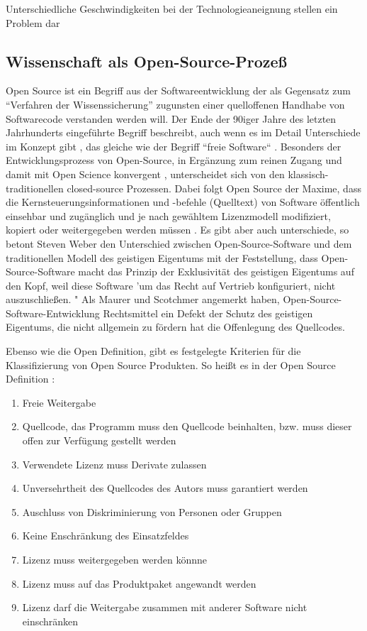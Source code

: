 Unterschiedliche Geschwindigkeiten bei der Technologieaneignung stellen ein Problem dar \cite{schulze_2013_open}

\subsection{Wissenschaft als Open-Source-Prozeß}

Open Source ist ein Begriff aus der Softwareentwicklung der als Gegensatz zum “Verfahren der Wissenssicherung”\cite{stallman2002} zugunsten einer quelloffenen Handhabe von Softwarecode verstanden werden will. Der Ende der 90iger Jahre des letzten Jahrhunderts eingeführte Begriff beschreibt, auch wenn es im Detail Unterschiede im Konzept gibt , das gleiche wie der Begriff “freie Software“ . Besonders der Entwicklungsprozess von Open-Source, in Ergänzung zum reinen Zugang und damit mit Open Science konvergent , unterscheidet sich von den klassisch-traditionellen closed-source Prozessen. Dabei folgt Open Source der Maxime, dass die Kernsteuerungsinformationen und -befehle (Quelltext) von Software öffentlich einsehbar und zugänglich und je nach gewähltem Lizenzmodell modifiziert, kopiert oder weitergegeben werden müssen . Es gibt aber auch unterschiede, so betont Steven Weber den Unterschied zwischen Open-Source-Software und dem traditionellen Modell des geistigen Eigentums mit der Feststellung, dass Open-Source-Software macht das Prinzip der Exklusivität des geistigen Eigentums auf den Kopf, weil diese Software 'um das Recht auf Vertrieb konfiguriert, nicht auszuschließen. "
Als Maurer und Scotchmer angemerkt haben, Open-Source-Software-Entwicklung Rechtsmittel ein Defekt der Schutz des geistigen Eigentums, die nicht allgemein zu fördern hat die Offenlegung des Quellcodes. 

Ebenso wie die Open Definition, gibt es festgelegte Kriterien für die Klassifizierung von Open Source Produkten. So heißt es in der Open Source Definition :
\begin{enumerate}
\item Freie Weitergabe
\item Quellcode, das Programm muss den Quellcode beinhalten, bzw. muss dieser offen zur Verfügung gestellt werden
\item Verwendete Lizenz muss Derivate zulassen
\item Unversehrtheit des Quellcodes des Autors muss garantiert werden
\item Auschluss von Diskriminierung von Personen oder Gruppen
\item Keine Enschränkung des Einsatzfeldes
\item Lizenz muss weitergegeben werden könnne
\item Lizenz muss auf das Produktpaket angewandt werden
\item Lizenz darf die Weitergabe zusammen mit anderer Software nicht einschränken
\end{enumerate}

